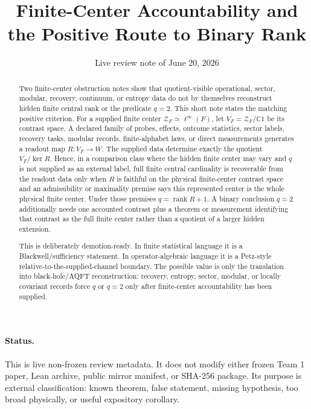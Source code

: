 \documentclass[12pt]{article}
\title{Finite-Center Accountability and the Positive Route to Binary Rank}
\author{}
\date{Live review note of June 20, 2026}
\theoremstyle{definition}
\theoremstyle{remark}
\newcommand{\C}{\mathbb C}
\newcommand{\Z}{\mathcal Z}
\begin{document}
\maketitle

\begin{abstract}
Two finite-center obstruction notes show that quotient-visible operational,
sector, modular, recovery, continuum, or entropy data do not by themselves
reconstruct hidden finite central rank or the predicate \(q=2\).  This short
note states the matching positive criterion.  For a supplied finite center
\(\Z_F\simeq \ell^\infty(F)\), let \(V_F=\Z_F/\C 1\) be its contrast space.
A declared family of probes, effects, outcome statistics, sector labels,
recovery tasks, modular records, finite-alphabet laws, or direct measurements
generates a readout map \(R:V_F\to W\).  The supplied data determine exactly
the quotient \(V_F/\ker R\).  Hence, in a comparison class where the hidden
finite center may vary and \(q\) is not supplied as an external label, full
finite central cardinality is recoverable from the readout data only when
\(R\) is faithful on the physical finite-center contrast space and an
admissibility or maximality premise says this represented center is the whole
physical finite center.  Under those premises \(q=\operatorname{rank}R+1\).  A
binary conclusion \(q=2\) additionally needs one accounted contrast plus a
theorem or measurement identifying that contrast as the full finite center
rather than a quotient of a larger hidden extension.

This is deliberately demotion-ready.  In finite statistical language it is a
Blackwell/sufficiency statement.  In operator-algebraic language it is a
Petz-style relative-to-the-supplied-channel boundary.  The possible value is
only the translation into black-hole/AQFT reconstruction: recovery, entropy,
sector, modular, or locally covariant records force \(q\) or \(q=2\) only
after finite-center accountability has been supplied.
\end{abstract}

\paragraph{Status.}
This is live non-frozen review metadata.  It does not modify either frozen Team
1 paper, Lean archive, public mirror manifest, or SHA-256 package.  Its purpose
is external classification: known theorem, false statement, missing hypothesis,
too broad physically, or useful expository corollary.
\end{document}
